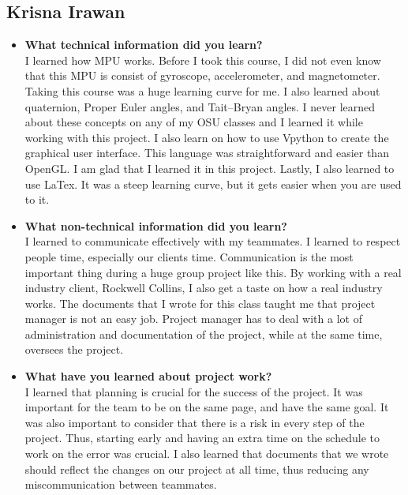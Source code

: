 	\subsection{Krisna Irawan}
	\begin{itemize}
			\item \textbf{What technical information did you learn?} \\
				I learned how MPU works. Before I took this course, I did not even know that this MPU is consist of gyroscope, accelerometer, and magnetometer. Taking this course was a huge learning curve for me. I also learned about quaternion, Proper Euler angles, and Tait–Bryan angles. I never learned about these concepts on any of my OSU classes and I learned it while working with this project. I also learn on how to use Vpython to create the graphical user interface. This language was straightforward and easier than OpenGL. I am glad that I learned it in this project. Lastly, I also learned to use LaTex. It was a steep learning curve, but it gets easier when you are used to it. \\

			\item \textbf{What non-technical information did you learn?} \\
				I learned to communicate effectively with my teammates. I learned to respect people time, especially our clients time. Communication is the most important thing during a huge group project like this. By working with a real industry client, Rockwell Collins, I also get a taste on how a real industry works. The documents that I wrote for this class taught me that project manager is not an easy job. Project manager has to deal with a lot of administration and documentation of the project, while at the same time, oversees the project. \\

			\item \textbf{What have you learned about project work?} \\
				I learned that planning is crucial for the success of the project. It was important for the team to be on the same page, and have the same goal. It was also important to consider that there is a risk in every step of the project. Thus, starting early and having an extra time on the schedule to work on the error was crucial. I also learned that documents that we wrote should reflect the changes on our project at all time, thus reducing any miscommunication between teammates.  \\


\end{itemize}
